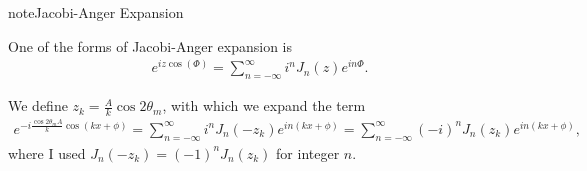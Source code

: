 \documentclass[letterpaper,12pt,english]{sphinxmanual}
\begin{document}
\begin{sphinxadmonition}{note}{Jacobi-Anger Expansion}

One of the forms of Jacobi-Anger expansion is
\label{\detokenize{matter-stimulated/single-frequency:equation-jacobi-anger-expansion}}\begin{equation}\label{equation:matter-stimulated/single-frequency:jacobi-anger-expansion}
\begin{split}e^{i z \cos (\Phi)} = \sum_{n=-\infty}^\infty i^n J_n(z) e^{i n\Phi}.\end{split}
\end{equation}\end{sphinxadmonition}

We define \(z_k = \frac{A}{k} \cos 2\theta_m\), with which we expand the term
\begin{equation*}
\begin{split}e^{-i\frac{\cos 2\theta_m A}{k} \cos (kx +\phi)} = \sum_{n=-\infty}^\infty i^n J_n (-z_k) e^{in (kx +\phi)} =  \sum_{n=-\infty}^\infty (-i)^n J_n (z_k) e^{in (kx +\phi)},\end{split}
\end{equation*}
where I used \(J_n(-z_k) = (-1)^n J_n(z_k)\) for integer \(n\).
\end{document}
